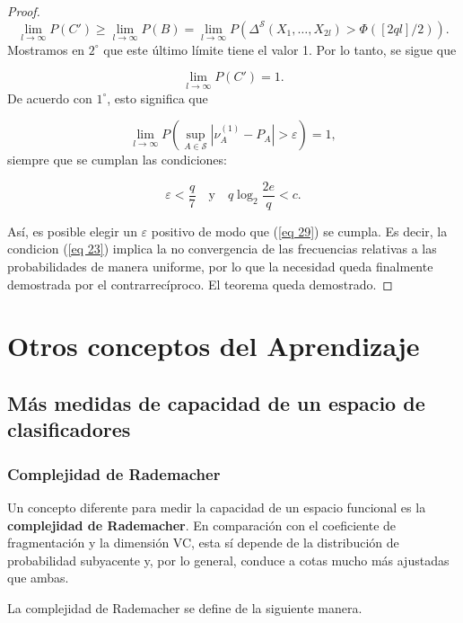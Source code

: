 \documentclass{report}
\begin{document}
\begin{proof}
\[
\lim_{l \to \infty} P(C') \geq \lim_{l \to \infty} P(B) = \lim_{l \to \infty} P(\Delta^{\mathcal{S}}(X_1, \dots, X_{2l}) > \Phi([2q l]/2)).
\]
Mostramos en \( 2^\circ \) que este último límite tiene el valor 1. Por lo tanto, se sigue que 

\[
\lim_{l \to \infty} P(C') = 1.
\]
De acuerdo con \( 1^\circ \), esto significa que 

\begin{equation}\label{eq 29}
\lim_{l \to \infty} P\left( \sup_{A \in \mathcal{S}} \left| \nu_A^{(1)} - P_A \right| > \varepsilon \right) = 1,
\end{equation}
siempre que se cumplan las condiciones:

\[
\varepsilon < \frac{q}{7} \quad \text{y} \quad q \log_2 \frac{2e}{q} < c.
\]\newline

Así, es posible elegir un \( \varepsilon \) positivo de modo que (\ref{eq 29}) se cumpla. Es decir,
la condicion (\ref{eq 23}) implica la no convergencia de las frecuencias relativas a las probabilidades de manera uniforme,
por lo que la necesidad queda finalmente demostrada por el contrarrecíproco. El teorema queda demostrado.

\end{proof}
    




\chapter{Otros conceptos del Aprendizaje}

\section{Más medidas de capacidad de un espacio de clasificadores}
\subsection{Complejidad de Rademacher}
Un concepto diferente para medir la capacidad de un espacio funcional es la \textbf{complejidad de Rademacher}. 
En comparación con el coeficiente de fragmentación y la dimensión VC, esta sí depende de la distribución de 
probabilidad subyacente y, por lo general, conduce a cotas mucho más ajustadas que ambas.\newline

La complejidad de Rademacher se define de la siguiente manera.\newline
\end{document}
